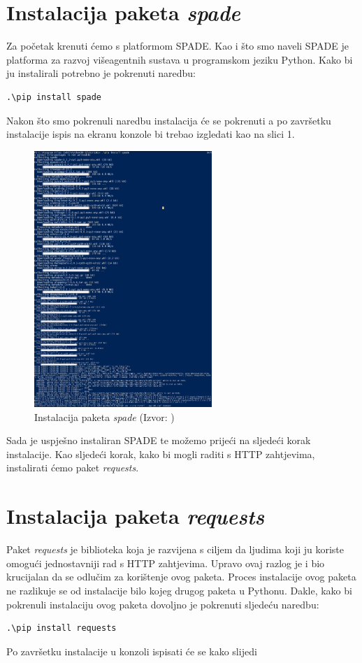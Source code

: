\documentclass[]{foi} %
\begin{document}
\section{Instalacija paketa \textit{spade}}
Za početak krenuti ćemo s platformom SPADE. Kao i što smo naveli SPADE je platforma za razvoj višeagentnih sustava u programskom jeziku Python. Kako bi ju instalirali potrebno je pokrenuti naredbu: \begin{verbatim}.\pip install spade\end{verbatim} Nakon što smo pokrenuli naredbu instalacija će se pokrenuti a po završetku instalacije ispis na ekranu konzole bi trebao izgledati kao na slici 1.

\begin{figure}[h!]
    \centering
    \includegraphics[width=0.6\textwidth]{slike/spade-install.jpg}
    \caption{Instalacija paketa \textit{spade} (Izvor: \citeauthor{ispisInstalacijeSpade} \citeyear{ispisInstalacijeSpade})}
    \label{fig:instalacijaSPADE}
\end{figure}

Sada je uspješno instaliran SPADE te možemo prijeći na sljedeći korak instalacije. Kao sljedeći korak, kako bi mogli raditi s HTTP zahtjevima, instalirati ćemo paket \textit{requests}.

\section{Instalacija paketa \textit{requests}}
Paket \textit{requests} je biblioteka koja je razvijena s ciljem da ljudima koji ju koriste omogući jednostavniji rad s HTTP zahtjevima. Upravo ovaj razlog je i bio krucijalan da se odlučim za korištenje ovog paketa. Proces instalacije ovog paketa ne razlikuje se od instalacije bilo kojeg drugog paketa u Pythonu. Dakle, kako bi pokrenuli instalaciju ovog paketa dovoljno je pokrenuti sljedeću naredbu:\begin{verbatim}.\pip install requests\end{verbatim} Po završetku instalacije u konzoli ispisati će se kako slijedi
\end{document}
